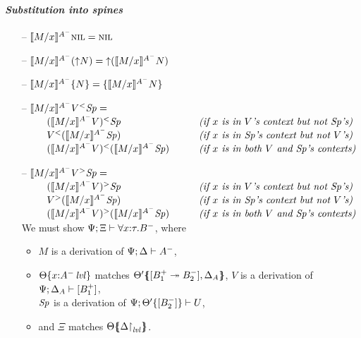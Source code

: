 \paragraph{\it Substitution into spines}

\begin{itemize}
\item[--] $\rsubsta{M}{x}{\tnil}{A^-} 
           = \tnil$
\item[--] $\rsubsta{M}{x}{(\tupl{N})}{A^-} 
           = \tupl{(\rsubsta{M}{x}{N}{A^-})}$
\item[--] $\rsubsta{M}{x}{\tlaxl{N}}{A^-} 
           = \tlaxl{\rsubsta{M}{x}{N}{A^-}}$
\item[--] $\rsubsta{M}{x}{\tappl{V}{\Sp}}{A^-} =$\\
    $\begin{array}{ll}
    \qquad \tappl{(\rsubsta{M}{x}{V}{A^-})}{\Sp}
     & \mbox{\it (if $x$ is in $V$'s context but not $\Sp$'s)}\\
    \qquad \tappl{V}{(\rsubsta{M}{x}{\Sp}{A^-})}
     & \mbox{\it (if $x$ is in $\Sp$'s context but not $V$'s)}\\
    \qquad \tappl{(\rsubsta{M}{x}{V}{A^-})}{(\rsubsta{M}{x}{\Sp}{A^-})}
     \qquad & \mbox{\it (if $x$ is in both $V$ and $\Sp$'s contexts)}
    \end{array}$
\item[--] $\rsubsta{M}{x}{\tappr{V}{\Sp}}{A^-} =$\\
    $\begin{array}{ll}
    \qquad \tappr{(\rsubsta{M}{x}{V}{A^-})}{\Sp}
     & \mbox{\it (if $x$ is in $V$'s context but not $\Sp$'s)}\\
    \qquad \tappr{V}{(\rsubsta{M}{x}{\Sp}{A^-})}
     & \mbox{\it (if $x$ is in $\Sp$'s context but not $V$'s)}\\
    \qquad \tappr{(\rsubsta{M}{x}{V}{A^-})}{(\rsubsta{M}{x}{\Sp}{A^-})}
     \qquad & \mbox{\it (if $x$ is in both $V$ and $\Sp$'s contexts)}
    \end{array}$ \smallskip\\
  We must show $\foc{\Psi}{\Xi}{\forall x{:}\tau. B^-}$, where
  \begin{itemize}
  \item $M$ is a derivation of $\foc{\Psi}{\Delta}{A^-}$, 
  \item $\tackon{\Theta}{x{:}\islvl{A^-}}$ matches 
     $\frameoff{\Theta'}{[B_1^+ \righti B_2^-], \Delta_A}$, 
     $V$ is a derivation of 
     $\foc{\Psi}{\Delta_A}{[B_1^+]}$,\\
     $\Sp$ is a derivation of 
     $\foc{\Psi}{\tackon{\Theta'}{[B_2^-]}}{U}$,
  \item and $\Xi$ matches $\frameoff{\Theta}{\restrictto{\Delta}{\mlvl}}$.
  \end{itemize}
  

\end{itemize}

